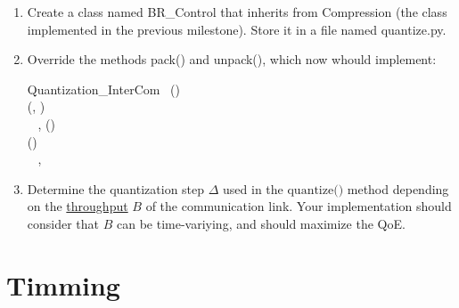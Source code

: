 \begin{enumerate}
\item Create a class named BR\_Control that inherits from
  Compression (the class implemented in the previous
  milestone). Store it in a file named quantize.py.
  
\item Override the methods pack() and unpack(),
  which now whould implement:

\begin{pseudocode}{Quantization\_InterCom}{~}
  \BEGIN
     \GETS {}()\\
     \GETS {}(, )\\
    ~ 
  \END
  \ENDPROCEDURE
  \BEGIN
    ,  \GETS {}()\\
     \GETS {}()\\
    ~ , 
  \END
  \ENDPROCEDURE
\end{pseudocode}

\item Determine the quantization step $\Delta$ used in the
  $\text{quantize()}$ method depending on
  the \href{https://en.wikipedia.org/wiki/Throughput}{throughput} $B$
  of the communication link. Your implementation should consider that
  $B$ can be time-variying, and should maximize the QoE.

\end{enumerate}

\section{Timming}

